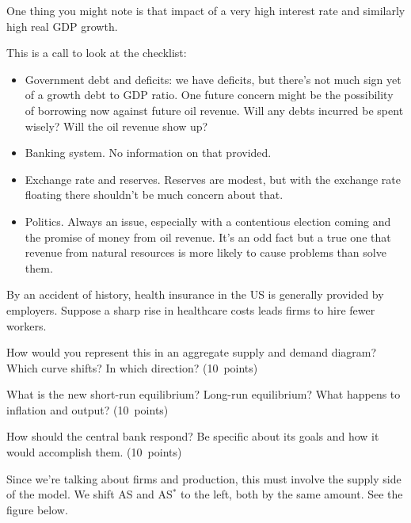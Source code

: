 \documentclass[letterpaper,12pt]{exam}
\begin{document}
\begin{questions}
\begin{solution}
\begin{parts}
One thing you might note is that impact of a very high interest rate
and similarly high real GDP growth.

\item This is a call to look at the checklist:
\begin{itemize}
\item Government debt and deficits:  we have deficits, but there's not
much sign yet of a growth debt to GDP ratio.
One future concern might be the possibility of borrowing now against future oil
revenue.  Will any debts incurred be spent wisely?
Will the oil revenue show up?
\item Banking system.  No information on that provided.
\item Exchange rate and reserves.  Reserves are modest,
but with the exchange rate floating there shouldn't be much
concern about that.
\item Politics.  Always an issue,
especially with a contentious election coming
and the promise of money from oil revenue.
It's an odd fact but a true one that revenue
from natural resources is more likely to cause problems than solve them.
\end{itemize}

\end{parts}
\end{solution}


By an accident of history, health insurance in the US is generally
provided by employers.
Suppose a sharp rise in healthcare costs leads firms to hire fewer workers.
\begin{parts}
\item How would you represent this in an aggregate supply and demand diagram?
Which curve shifts?  In which direction?
(10~points)
\item What is the new short-run equilibrium?  Long-run equilibrium?
What happens to inflation and output?
(10~points)
\item How should the central bank respond?
Be specific about its goals and how it would accomplish them.
(10~points)
\end{parts}


\begin{solution}
\begin{parts}
\item Since we're talking about firms and production,
this must involve the supply side of the model.
We shift AS and AS$^*$ to the left, both by the same amount.
See the figure below.


\end{parts}
\end{solution}
\end{questions}
\end{document}
